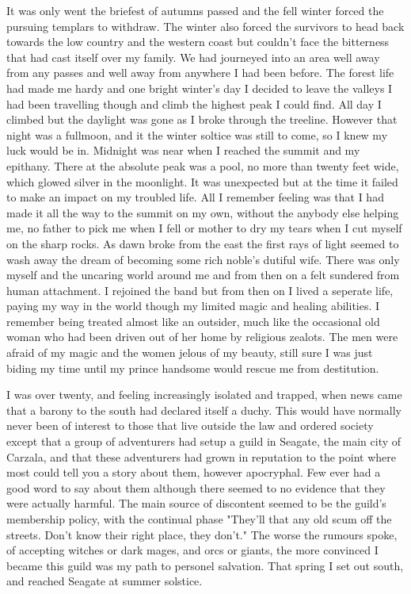 \documentclass{article}
\begin{document}
It was only went the briefest of autumns passed and the fell winter
forced the pursuing templars to withdraw.  The winter also forced the
survivors to head back towards the low country and the western coast
but couldn't face the bitterness that had cast itself over my family.
We had journeyed into an area well away from any passes and well away
from anywhere I had been before.  The forest life had made me hardy
and one bright winter's day I decided to leave the valleys I had been
travelling though and climb the highest peak I could find. All day I
climbed but the daylight was gone as I broke through the treeline.
However that night was a fullmoon, and it the winter soltice was still
to come, so I knew my luck would be in.  Midnight was near when I
reached the summit and my epithany.  There at the absolute peak was a
pool, no more than twenty feet wide, which glowed silver in the
moonlight.  It was unexpected but at the time it failed to make an
impact on my troubled life.  All I remember feeling was that I had
made it all the way to the summit on my own, without the anybody else
helping me, no father to pick me when I fell or mother to dry my tears
when I cut myself on the sharp rocks.  As dawn broke from the east the
first rays of light seemed to wash away the dream of becoming some
rich noble's dutiful wife.  There was only myself and the uncaring
world around me and from then on a felt sundered from human
attachment.  I rejoined the band but from then on I lived a seperate
life, paying my way in the world though my limited magic and healing
abilities.  I remember being treated almost like an outsider, much
like the occasional old woman who had been driven out of her home by
religious zealots. The men were afraid of my magic and the women
jelous of my beauty, still sure I was just biding my time until my
prince handsome would rescue me from destitution.

I was over twenty, and feeling increasingly isolated and trapped, when
news came that a barony to the south had declared itself a duchy.
This would have normally never been of interest to those that live
outside the law and ordered society except that a group of adventurers
had setup a guild in Seagate, the main city of Carzala, and that these
adventurers had grown in reputation to the point where most could tell
you a story about them, however apocryphal.  Few ever had a good word
to say about them although there seemed to no evidence that they were
actually harmful.  The main source of discontent seemed to be the
guild's membership policy, with the continual phase "They'll that any
old scum off the streets.  Don't know their right place, they don't."
The worse the rumours spoke, of accepting witches or dark mages, and
orcs or giants, the more convinced I became this guild was my path to
personel salvation.  That spring I set out south, and reached Seagate
at summer solstice.
\end{document}
